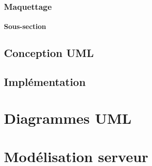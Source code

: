 \documentclass[]{report}
\begin{document}
\section{Maquettage}

\subsection{Sous-section}

\chapter{Conception UML}

\chapter{Implémentation}

\part{Diagrammes UML}

\part{Modélisation serveur}
\end{document}
